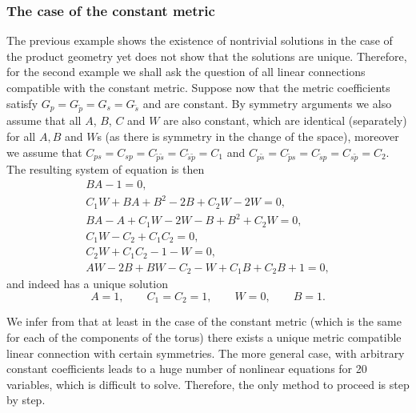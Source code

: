 \documentclass[pdftex]{sigma}
\numberwithin{equation}{section}
\newcommand{\ip}{{\tilde{p}}}
\newcommand{\is}{{\tilde{s}}}
\begin{document}
\subsubsection{The case of the constant metric}
The previous example shows the existence of nontrivial solutions in the case of the product geometry yet does not show that the solutions are unique. Therefore, for the second example we shall ask the question of all linear connections compatible with the constant metric. Suppose now that the metric coefficients satisfy $G_p=G_\ip = G_s=G_\is$ and are constant. By symmetry arguments
we also assume that all $A$, $B$, $C$ and $W$ are also constant, which are identical (separately) for all $A,B$ and $W$s (as there is symmetry in the change of the space), moreover we assume that $C_{ps}=C_{sp}=C_{\ip\is}=C_{\is\ip}=C_1$ and $C_{p\is}=C_{\ip s}=C_{\is p}=C_{s\ip}=C_2$. The resulting system of equation is then
\begin{gather*}
BA-1 =0, \\
C_1 W + BA + B^2 -2B +C_2W - 2W =0, \\
BA -A + C_1W - 2W -B +B^2 +C_2W = 0,\\
C_1W - C_2 +C_1 C_2 =0, \\
C_2W + C_1C_2 -1 -W =0, \\
AW - 2B +BW -C_2-W+C_1B+C_2B+1=0,
\end{gather*}
and indeed has a unique solution
\[ A=1, \qquad C_1=C_2=1, \qquad W=0, \qquad B=1. \]

We infer from that at least in the case of the constant metric (which is the same for each of the components
of the torus) there exists a unique metric compatible linear connection with certain symmetries. The more general
case, with arbitrary constant coefficients leads to a huge number of nonlinear equations for 20 variables, which
is difficult to solve. Therefore, the only method to proceed is step by step.
\end{document}
